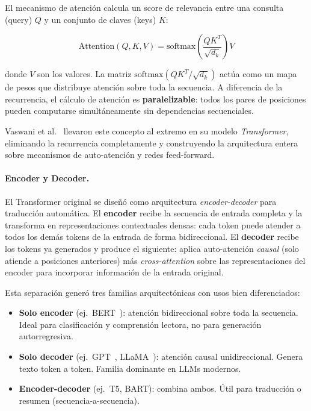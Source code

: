 El mecanismo de atención calcula un score de relevancia entre una consulta (query) $Q$ y un conjunto de claves (keys) $K$:

\begin{equation}
\text{Attention}(Q, K, V) = \text{softmax}\left(\frac{QK^T}{\sqrt{d_k}}\right) V
\end{equation}

donde $V$ son los valores. La matriz $\text{softmax}(QK^T / \sqrt{d_k})$ actúa como un mapa de pesos que distribuye atención sobre toda la secuencia. A diferencia de la recurrencia, el cálculo de atención es \textbf{paralelizable}: todos los pares de posiciones pueden computarse simultáneamente sin dependencias secuenciales.

Vaswani et al.~\cite{vaswani2017attention} llevaron este concepto al extremo en su modelo \textit{Transformer}, eliminando la recurrencia completamente y construyendo la arquitectura entera sobre mecanismos de auto-atención y redes feed-forward.

\paragraph{Encoder y Decoder.}
El Transformer original se diseñó como arquitectura \textit{encoder-decoder} para traducción automática. El \textbf{encoder} recibe la secuencia de entrada completa y la transforma en representaciones contextuales densas: cada token puede atender a todos los demás tokens de la entrada de forma bidireccional. El \textbf{decoder} recibe los tokens ya generados y produce el siguiente: aplica auto-atención \textit{causal} (solo atiende a posiciones anteriores) más \textit{cross-attention} sobre las representaciones del encoder para incorporar información de la entrada original.

Esta separación generó tres familias arquitectónicas con usos bien diferenciados:

\begin{itemize}
    \item \textbf{Solo encoder} (ej.\ BERT~\cite{devlin2018bert}): atención bidireccional sobre toda la secuencia. Ideal para clasificación y comprensión lectora, no para generación autorregresiva.
    \item \textbf{Solo decoder} (ej.\ GPT~\cite{radford2018gpt1}, LLaMA~\cite{touvron2023llama}): atención causal unidireccional. Genera texto token a token. Familia dominante en LLMs modernos.
    \item \textbf{Encoder-decoder} (ej.\ T5, BART): combina ambos. Útil para traducción o resumen (secuencia-a-secuencia).
\end{itemize}

